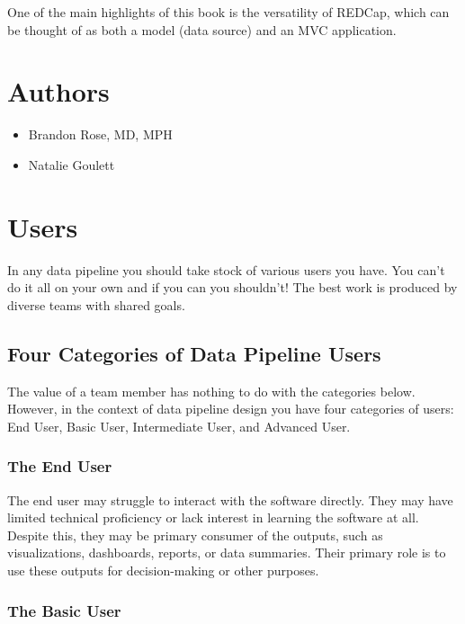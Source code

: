 \documentclass[
]{book}
\providecommand{\tightlist}{%
  \setlength{\itemsep}{0pt}\setlength{\parskip}{0pt}}
\begin{document}
One of the main highlights of this book is the versatility of REDCap, which can be thought of as both a model (data source) and an MVC application.

\chapter{Authors}\label{authors}

\begin{itemize}
\tightlist
\item
  Brandon Rose, MD, MPH
\item
  Natalie Goulett
\end{itemize}

\chapter{Users}\label{users}

In any data pipeline you should take stock of various users you have. You can't do it all on your own and if you can you shouldn't! The best work is produced by diverse teams with shared goals.

\section{Four Categories of Data Pipeline Users}\label{four-categories-of-data-pipeline-users}

The value of a team member has nothing to do with the categories below. However, in the context of data pipeline design you have four categories of users: End User, Basic User, Intermediate User, and Advanced User.

\subsection*{The End User}\label{the-end-user}

The end user may struggle to interact with the software directly. They may have limited technical proficiency or lack interest in learning the software at all. Despite this, they may be primary consumer of the outputs, such as visualizations, dashboards, reports, or data summaries. Their primary role is to use these outputs for decision-making or other purposes.

\subsection*{The Basic User}\label{the-basic-user}
\end{document}
